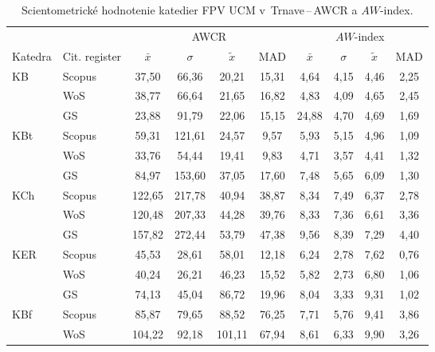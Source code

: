 \begin{table}
  \centering\small
  \caption[Hodnotenie FPV\,--\,AWCR a $AW$-index]{Scientometrické hodnotenie katedier FPV UCM v~Trnave\,--\,AWCR a $AW$-index.}
\label{tab:5-staff.results}
\begin{tabularx}{\textwidth}{Xlcccc@{\hspace{3ex}}cccc}
  \toprule\noalign{\vspace{.3ex}}
          &       & \multicolumn{4}{c}{AWCR}         & \multicolumn{4}{c}{$AW$-index}  \\
  Katedra &  Cit. register& $\bar{x}$      & $\sigma$  & $\tilde{x}$ & MAD  & $\bar{x}$      & $\sigma$  & $\tilde{x}$  & MAD  \\[0.3ex]
  \midrule\noalign{\vspace{.5ex}}
 KB   & Scopus & 37,50  & 66,36  & 20,21  & 15,31  & 4,64     & 4,15 & 4,46  & 2,25 \\
      & WoS    & 38,77  & 66,64  & 21,65  & 16,82  & 4,83     & 4,09 & 4,65  & 2,45 \\
      & GS     & 23,88  & 91,79  & 22,06  & 15,15  & 24,88    & 4,70 & 4,69  & 1,69 \\[3ex]
 KBt  & Scopus & 59,31  & 121,61 & 24,57  & 9,57   & 5,93     & 5,15 & 4,96  & 1,09 \\
      & WoS    & 33,76  & 54,44  & 19,41  & 9,83   & 4,71     & 3,57 & 4,41  & 1,32 \\
      & GS     & 84,97  & 153,60 & 37,05  & 17,60  & 7,48     & 5,65 & 6,09  & 1,30 \\[3ex]
 KCh  & Scopus & 122,65 & 217,78 & 40,94  & 38,87  & 8,34     & 7,49 & 6,37  & 2,78 \\
      & WoS    & 120,48 & 207,33 & 44,28  & 39,76  & 8,33     & 7,36 & 6,61  & 3,36 \\
      & GS     & 157,82 & 272,44 & 53,79  & 47,38  & 9,56     & 8,39 & 7,29  & 4,40 \\[3ex]
 KER  & Scopus & 45,53  & 28,61  & 58,01  & 12,18  & 6,24     & 2,78 & 7,62  & 0,76 \\
      & WoS    & 40,24  & 26,21  & 46,23  & 15,52  & 5,82     & 2,73 & 6,80  & 1,06 \\
      & GS     & 74,13  & 45,04  & 86,72  & 19,96  & 8,04     & 3,33 & 9,31  & 1,02 \\[3ex]
 KBf  & Scopus & 85,87  & 79,65  & 88,52  & 76,25  & 7,71     & 5,76 & 9,41  & 3,86 \\
      & WoS    & 104,22 & 92,18  & 101,11 & 67,94  & 8,61     & 6,33 & 9,90  & 3,26 \\

\end{tabularx}
\end{table}
